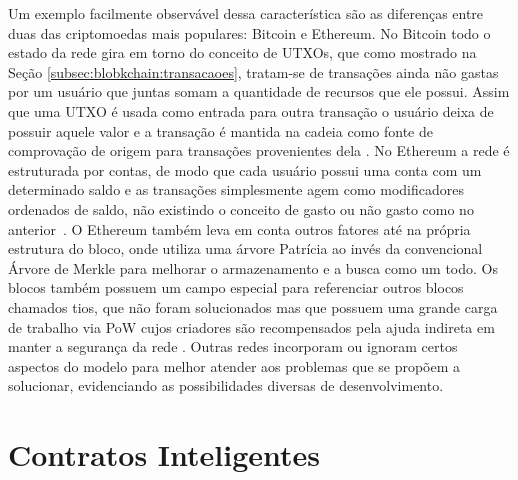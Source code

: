 Um exemplo facilmente observável dessa característica são as diferenças entre duas das criptomoedas mais populares: Bitcoin e Ethereum. 
%
No Bitcoin todo o estado da rede gira em torno do conceito de \acp{UTXO}, que como mostrado na Seção \ref{subsec:blobkchain:transacaoes}, tratam-se de transações ainda não gastas por um usuário que juntas somam a quantidade de recursos que ele possui. Assim que uma \ac{UTXO} é usada como entrada para outra transação o usuário deixa de possuir aquele valor e a transação é mantida na cadeia como fonte de comprovação de origem para transações provenientes dela \cite{blockchain:survey_bitcoin}. No Ethereum a rede é estruturada por contas, de modo que cada usuário possui uma conta com um determinado saldo e as transações simplesmente agem como modificadores ordenados de saldo, não existindo o conceito de gasto ou não gasto como no anterior~\cite{blockchain:mastering_ethereum}. O Ethereum também leva em conta outros fatores até na própria estrutura do bloco, onde utiliza uma árvore Patrícia ao invés da convencional Árvore de Merkle para melhorar o armazenamento e a busca como um todo. Os blocos também possuem um campo especial para referenciar outros blocos chamados tios, que não foram solucionados mas que possuem uma grande carga de trabalho via \ac{PoW} cujos criadores são recompensados pela ajuda indireta em manter a segurança da rede \cite{blockchain:ethereum}. 
 Outras redes incorporam ou ignoram certos aspectos do modelo para melhor atender aos problemas que se propõem a solucionar, evidenciando as possibilidades diversas de desenvolvimento.

\section{Contratos Inteligentes}
\label{sec:blockchain:smart_contracts}
\acresetall

